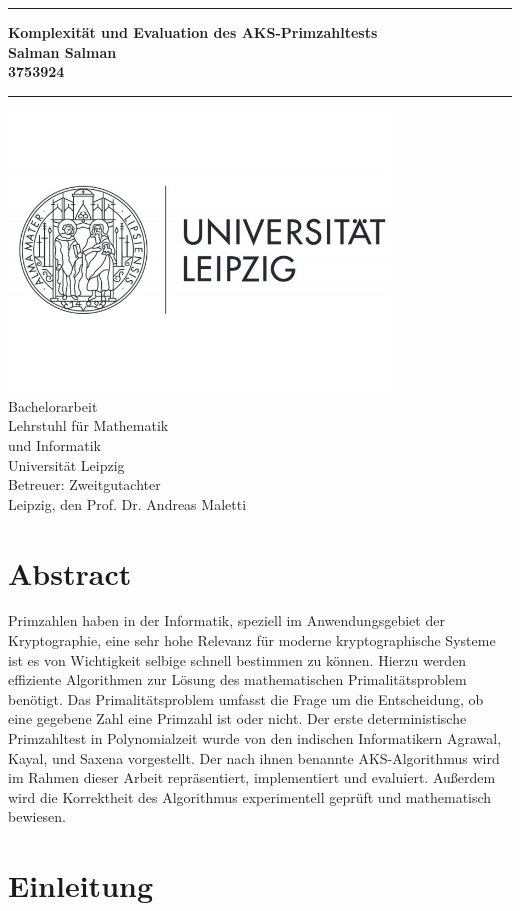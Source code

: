 \documentclass[12pt,oneside]{article}
\theoremstyle{remark}
\theoremstyle{definition}
\newcommand{\JMUTitle}[9]{

  \thispagestyle{empty}
  \vspace*{\stretch{1}}
  {\parindent0cm
  \rule{\linewidth}{.7ex}}
  \begin{flushright}
    \vspace*{\stretch{1}}
    \sffamily\bfseries\Huge
    #1\\
    \vspace*{\stretch{1}}
    \sffamily\bfseries\large
    #2\\
    \vspace*{\stretch{1}}
    \sffamily\bfseries\small
    #3
  \end{flushright}
  \rule{\linewidth}{.7ex}

  \vspace*{\stretch{1}}
  \begin{center}
    \includegraphics[width=4in]{logo} \\
    \vspace*{\stretch{1}}
    \Large  Bachelorarbeit   \\

    \vspace*{\stretch{2}}
   \large Lehrstuhl für Mathematik \\
    \large und Informatik \\
    \large Universität Leipzig\\
    \vspace*{\stretch{1}}
    \large Betreuer:  #8 \\[1mm]
    
    \vspace*{\stretch{1}}
    \large Leipzig, den #7
  \end{center}
}
\begin{document}
  \JMUTitle
      {Komplexität und Evaluation des AKS-Primzahltests  }  
      {Salman Salman}                        
      {3753924}
      
      {Fakultät für Informatik und Mathematik}  %
      {Leipzig 2020}                          %
      {\today}                              %
      {Prof. Dr. Andreas Maletti}               %
      {Zweitgutachter}                          %
      
  \clearpage

\lhead{}
    \setcounter{page}{1}

\tableofcontents
\clearpage

\listoffigures

\listoftables
\clearpage

\setlength{\parskip}{0.5em} 


\section*{Abstract}
Primzahlen haben in der Informatik, speziell im Anwendungsgebiet der Kryptographie, eine sehr hohe Relevanz für moderne kryptographische Systeme ist es von Wichtigkeit selbige schnell bestimmen zu können. Hierzu werden effiziente Algorithmen zur Lösung des mathematischen Primalitätsproblem benötigt. Das Primalitätsproblem umfasst die Frage um die Entscheidung, ob eine gegebene Zahl eine Primzahl ist oder nicht. Der erste deterministische Primzahltest in Polynomialzeit wurde von den indischen Informatikern Agrawal, Kayal, und Saxena vorgestellt. Der nach ihnen benannte AKS-Algorithmus wird im Rahmen dieser Arbeit repräsentiert, implementiert und evaluiert. Außerdem wird die Korrektheit des Algorithmus experimentell geprüft und mathematisch bewiesen. 


\clearpage
{}  
    \setcounter{page}{1}
\lhead{\nouppercase{\leftmark}}


 

\section{Einleitung} \label{einleitung}
\end{document}
